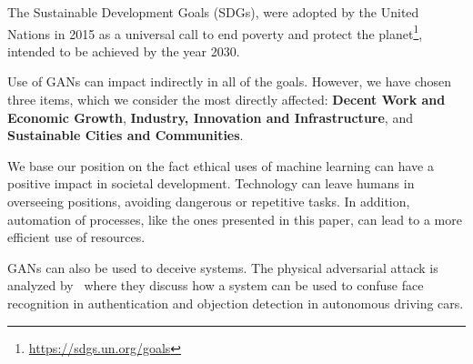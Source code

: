 \documentclass[12pt]{article}
\begin{document}
    The Sustainable Development Goals (SDGs), were adopted by the United Nations in 2015 as a universal call
    to end poverty and protect the planet\footnote{\url{https://sdgs.un.org/goals}}, intended to be achieved by the year 2030.

    Use of GANs can impact indirectly in all of the goals.
    However, we have chosen three items, which we consider the most directly affected:
    \textbf{Decent Work and Economic Growth}, \textbf{Industry, Innovation and Infrastructure}, and
    \textbf{Sustainable Cities and Communities}.

    We base our position on the fact ethical uses of machine learning can have a positive impact in societal development.
    Technology can leave humans in overseeing positions, avoiding dangerous or repetitive tasks.
    In addition, automation of processes, like the ones presented in this paper, can lead to a more efficient use of resources.

    GANs can also be used to deceive systems.
    The physical adversarial attack is analyzed by~\cite{zhao2019seeing} where they discuss
    how a system can be used to confuse face recognition in authentication and objection detection in autonomous driving cars.
\end{document}
